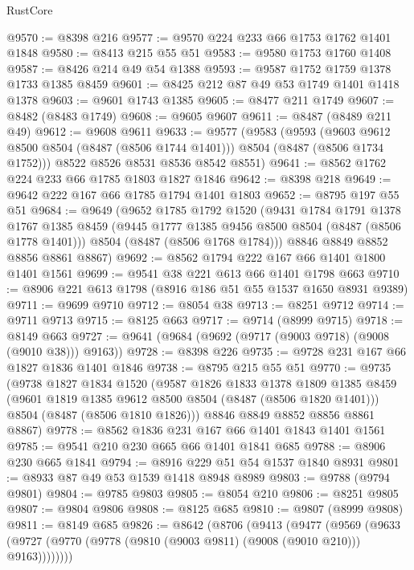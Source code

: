 \begin{lexlean}{RustCore}
\begin{coremodule}
@9570 := @8398 @216
@9577 := @9570 @224 @233 @66 @1753 @1762 @1401 @1848
@9580 := @8413 @215 @55 @51
@9583 := @9580 @1753 @1760 @1408
@9587 := @8426 @214 @49 @54 @1388
@9593 := @9587 @1752 @1759 @1378 @1733 @1385 @8459
@9601 := @8425 @212 @87 @49 @53 @1749 @1401 @1418 @1378
@9603 := @9601 @1743 @1385
@9605 := @8477 @211 @1749
@9607 := @8482 (@8483 @1749)
@9608 := @9605 @9607
@9611 := @8487 (@8489 @211 @49)
@9612 := @9608 @9611
@9633 := @9577
    (@9583
      (@9593
        (@9603 @9612 @8500 @8504 (@8487 (@8506 @1744 @1401)))
        @8504
        (@8487 (@8506 @1734 @1752)))
      @8522
      @8526
      @8531
      @8536
      @8542
      @8551)
@9641 := @8562 @1762 @224 @233 @66 @1785 @1803 @1827 @1846
@9642 := @8398 @218
@9649 := @9642 @222 @167 @66 @1785 @1794 @1401 @1803
@9652 := @8795 @197 @55 @51
@9684 := @9649
    (@9652
      @1785
      @1792
      @1520
      (@9431
        @1784
        @1791
        @1378
        @1767
        @1385
        @8459
        (@9445 @1777 @1385 @9456 @8500 @8504 (@8487 (@8506 @1778 @1401)))
        @8504
        (@8487 (@8506 @1768 @1784)))
      @8846
      @8849
      @8852
      @8856
      @8861
      @8867)
@9692 := @8562 @1794 @222 @167 @66 @1401 @1800 @1401 @1561
@9699 := @9541 @38 @221 @613 @66 @1401 @1798 @663
@9710 := @8906 @221 @613 @1798 (@8916 @186 @51 @55 @1537 @1650 @8931 @9389)
@9711 := @9699 @9710
@9712 := @8054 @38
@9713 := @8251 @9712
@9714 := @9711 @9713
@9715 := @8125 @663
@9717 := @9714 (@8999 @9715)
@9718 := @8149 @663
@9727 := @9641 (@9684 (@9692 (@9717 (@9003 @9718) (@9008 (@9010 @38))) @9163))
@9728 := @8398 @226
@9735 := @9728 @231 @167 @66 @1827 @1836 @1401 @1846
@9738 := @8795 @215 @55 @51
@9770 := @9735
    (@9738
      @1827
      @1834
      @1520
      (@9587
        @1826
        @1833
        @1378
        @1809
        @1385
        @8459
        (@9601 @1819 @1385 @9612 @8500 @8504 (@8487 (@8506 @1820 @1401)))
        @8504
        (@8487 (@8506 @1810 @1826)))
      @8846
      @8849
      @8852
      @8856
      @8861
      @8867)
@9778 := @8562 @1836 @231 @167 @66 @1401 @1843 @1401 @1561
@9785 := @9541 @210 @230 @665 @66 @1401 @1841 @685
@9788 := @8906 @230 @665 @1841
@9794 := @8916 @229 @51 @54 @1537 @1840 @8931
@9801 := @8933 @87 @49 @53 @1539 @1418 @8948 @8989
@9803 := @9788 (@9794 @9801)
@9804 := @9785 @9803
@9805 := @8054 @210
@9806 := @8251 @9805
@9807 := @9804 @9806
@9808 := @8125 @685
@9810 := @9807 (@8999 @9808)
@9811 := @8149 @685
@9826 := @8642
    (@8706
      (@9413
        (@9477
          (@9569
            (@9633 (@9727 (@9770 (@9778 (@9810 (@9003 @9811) (@9008 (@9010 @210))) @9163))))))))

\end{coremodule}
\end{lexlean}
